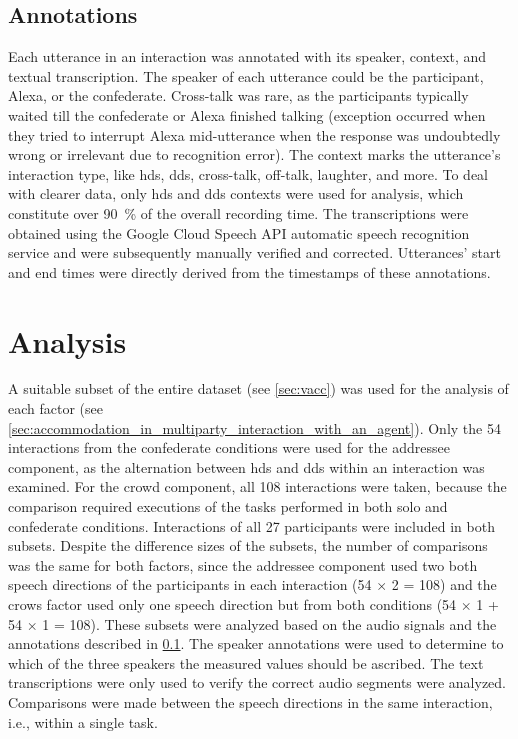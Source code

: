 \subsection{Annotations}
\label{subsec:annotations_hhci}

Each utterance in an interaction was annotated with its speaker, context, and textual transcription.
The speaker of each utterance could be the participant, Alexa, or the confederate.
Cross-talk was rare, as the participants typically waited till the confederate or Alexa finished talking (exception occurred when they tried to interrupt Alexa mid-utterance when the response was undoubtedly wrong or irrelevant due to recognition error).
The context marks the utterance's interaction type, like \ac{hds}, \ac{dds}, cross-talk, off-talk, laughter, and more.
To deal with clearer data, only \ac{hds} and \ac{dds} contexts were used for analysis, which constitute over \SI{90}{\percent} of the overall recording time.
The transcriptions were obtained using the Google Cloud Speech API automatic speech recognition service and were subsequently manually verified and corrected.
Utterances' start and end times were directly derived from the timestamps of these annotations.

\section{Analysis}
\label{sec:analysis_hhci}

A suitable subset of the entire dataset (see \cref{sec:vacc}) was used for the analysis of each factor (see \cref{sec:accommodation_in_multiparty_interaction_with_an_agent}).
Only the 54 interactions from the confederate conditions were used for the addressee component, as the alternation between \ac{hds} and \ac{dds} within an interaction was examined.
For the crowd component, all 108 interactions were taken, because the comparison required executions of the tasks performed in both solo and confederate conditions.
Interactions of all 27 participants were included in both subsets.
Despite the difference sizes of the subsets, the number of comparisons was the same for both factors, since the addressee component used two both speech directions of the participants in each interaction (54 $\times$ 2 = 108) and the crows factor used only one speech direction but from both conditions (54 $\times$ 1 + 54 $\times$ 1 = 108).
These subsets were analyzed based on the audio signals and the annotations described in \cref{subsec:annotations_hhci}.
The speaker annotations were used to determine to which of the three speakers the measured values should be ascribed.
The text transcriptions were only used to verify the correct audio segments were analyzed.
Comparisons were made between the speech directions in the same interaction, i.e., within a single task.

